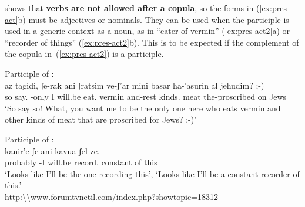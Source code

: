 \begin{exe}
\begin{xlist}
\begin{exe}
\begin{xlist}
\begin{exe}
\begin{exe}
\begin{xlist}
\begin{exe}
\begin{exe}
\begin{xlist}
\begin{exe}
\begin{xlist}
\begin{exe}
\begin{xlist}
\begin{exe}
\begin{xlist}
\begin{exe}
\begin{xlist}
\begin{xlist}
\begin{exe}
\begin{xlist}
\begin{exe}
\begin{xlist}
\begin{exe}
\begin{exe}
\begin{exe}
\begin{xlist}
\begin{exe}
\begin{exe}
\begin{xlist}
\begin{exe}
\begin{xlist}
 \z
\z 
\cite{doron00} shows that \textbf{verbs are not allowed after a copula}, so the forms in (\ref{ex:pres-act}b) must be adjectives or nominals. They can be used when the participle is used in a generic context as a noun, as in ``eater of vermin'' (\ref{ex:pres-act2}a) or ``recorder of things'' (\ref{ex:pres-act2}b). This is to be expected if the complement of the copula in~(\ref{ex:pres-act2}) is a participle.
 \begin{exe}
 \ex  \label{ex:pres-act2} 
 \begin{xlist} 
  \ex  Participle of {\tkal}: \\
	{ \gll az tagidi, ʃe-rak ani   ʃratsim ve-ʃ'ar mini basar ha-'asurin al jehudim? ;-)\\
        so say. -only I will.be eat. vermin and-rest kinds. meat the-proscribed on Jews\\
      \glt `So say so! What, you want me to be the only one here who eats vermin and other kinds of meat that are proscribed for Jews? ;-)'\footnotemark } 
 

  \ex  Participle of {\thif}: \\
 	{ \gll kanir'e ʃe-ani   kavua ʃel ze.\\
        probably -I will.be record. constant of this\\
      \glt `Looks like I'll be the one recording this', `Looks like I'll be a constant recorder of this.'\\
        \url{http:\\www.forumtvnetil.com/index.php?showtopic=18312} } 
 
 \z
\z 


\end{xlist}
\end{exe}
\end{xlist}
\end{exe}
\end{xlist}
\end{exe}
\end{exe}
\end{xlist}
\end{exe}
\end{exe}
\end{exe}
\end{xlist}
\end{exe}
\end{xlist}
\end{exe}
\end{xlist}
\end{xlist}
\end{exe}
\end{xlist}
\end{exe}
\end{xlist}
\end{exe}
\end{xlist}
\end{exe}
\end{xlist}
\end{exe}
\end{exe}
\end{xlist}
\end{exe}
\end{exe}
\end{xlist}
\end{exe}
\end{xlist}
\end{exe}
